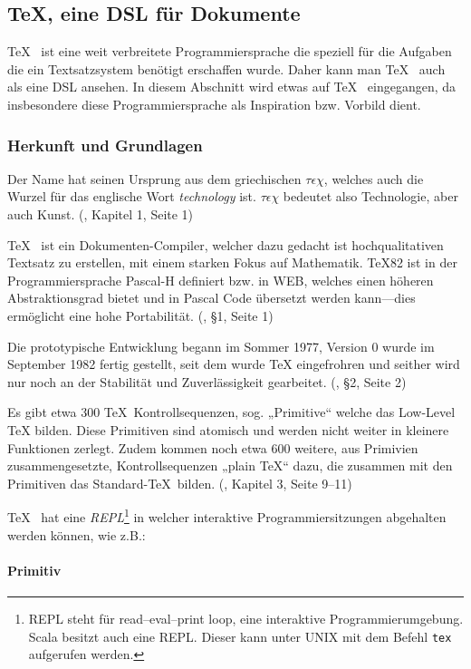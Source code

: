 \subsection{\TeX, eine DSL für Dokumente}

\TeX~ ist eine weit verbreitete Programmiersprache die speziell für die
Aufgaben die ein Textsatzsystem benötigt erschaffen wurde. Daher kann man
\TeX~ auch als eine DSL ansehen. In diesem Abschnitt wird etwas auf
\TeX~ eingegangen, da insbesondere diese Programmiersprache als Inspiration
bzw. Vorbild dient.


\subsubsection{Herkunft und Grundlagen}

Der Name hat seinen Ursprung aus dem griechischen $\tau\epsilon\chi$,
welches auch die Wurzel für das englische Wort \emph{technology} ist.
$\tau\epsilon\chi$ bedeutet also Technologie, aber auch Kunst.
(\cite{tex-a}, Kapitel 1, Seite 1)

\TeX~ ist ein Dokumenten-Compiler, welcher dazu gedacht ist hochqualitativen
Textsatz zu erstellen, mit einem starken Fokus auf
Mathematik. \TeX82 ist in der Programmiersprache Pascal-H definiert
bzw. in WEB, welches einen höheren Abstraktionsgrad bietet und in Pascal
Code übersetzt werden kann---dies ermöglicht eine hohe Portabilität.
(\cite{tex-b}, §1, Seite 1)

Die prototypische Entwicklung begann im Sommer 1977, Version 0 wurde
im September 1982 fertig gestellt, seit dem wurde TeX eingefrohren
und seither wird nur noch an der Stabilität und Zuverlässigkeit
gearbeitet. (\cite{tex-b}, §2, Seite 2)

Es gibt etwa 300 \TeX~Kontrollsequenzen, sog. „Primitive“ welche das
Low-Level TeX bilden. Diese Primitiven sind atomisch und werden nicht weiter
in kleinere Funktionen zerlegt.
Zudem kommen noch etwa 600 weitere, aus Primivien zusammengesetzte,
Kontrollsequenzen „plain \TeX“ dazu,
die zusammen mit den Primitiven das Standard-\TeX~bilden.
(\cite{tex-a}, Kapitel 3, Seite 9--11)

\TeX~ hat eine \emph{REPL}\footnote{REPL steht für read–eval–print loop,
eine interaktive Programmierumgebung. Scala besitzt auch eine REPL.
Dieser kann unter UNIX mit dem Befehl \lstinline|tex| aufgerufen werden.}
in welcher interaktive Programmiersitzungen abgehalten werden können,
wie z.B.:

\paragraph{Primitiv}


